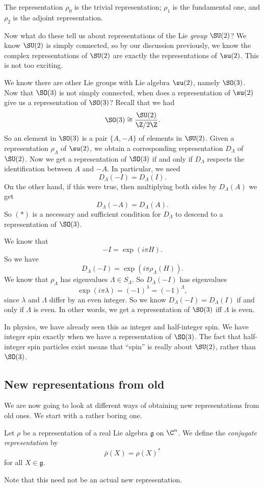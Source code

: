 \documentclass[a4paper]{article}
\begin{document}
The representation $\rho_0$ is the trivial representation; $\rho_1$ is the fundamental one, and $\rho_2$ is the adjoint representation.

Now what do these tell us about representations of the Lie \emph{group} $\SU(2)$? We know $\SU(2)$ is simply connected, so by our discussion previously, we know the complex representations of $\SU(2)$ are exactly the representations of $\su(2)$. This is not too exciting.

We know there are other Lie groups with Lie algebra $\su(2)$, namely $\SO(3)$. Now that $\SO(3)$ is not simply connected, when does a representation of $\su(2)$ give us a representation of $\SO(3)$? Recall that we had
\[
  \SO(3) \cong \frac{\SU(2)}{\Z/2\Z}.
\]
So an element in $\SO(3)$ is a pair $\{A, -A\}$ of elements in $\SU(2)$. Given a representation $\rho_\Lambda$ of $\su(2)$, we obtain a corresponding representation $D_\Lambda$ of $\SU(2)$. Now we get a representation of $\SO(3)$ if and only if $D_\Lambda$ respects the identification between $A$ and $-A$. In particular, we need
\[
  D_\Lambda(-I) = D_\Lambda(I).\tag{$*$}
\]
On the other hand, if this were true, then multiplying both sides by $D_\Lambda(A)$ we get
\[
  D_\Lambda(-A) = D_\Lambda(A).
\]
So $(*)$ is a necessary and sufficient condition for $D_\Lambda$ to descend to a representation of $\SO(3)$.

We know that
\[
  -I = \exp(i\pi H).
\]
So we have
\[
  D_\Lambda(-I) = \exp(i\pi \rho_\Lambda(H)).
\]
We know that $\rho_\Lambda$ has eigenvalues $\Lambda \in S_\Lambda$. So $D_\Lambda(-I)$ has eigenvalues
\[
  \exp(i\pi\lambda) = (-1)^\lambda = (-1)^\Lambda,
\]
since $\lambda$ and $\Lambda$ differ by an even integer. So we know $D_\Lambda(-I) = D_\Lambda (I)$ if and only if $\Lambda$ is even. In other words, we get a representation of $\SO(3)$ iff $\Lambda$ is even.

In physics, we have already seen this as integer and half-integer spin. We have integer spin exactly when we have a representation of $\SO(3)$. The fact that half-integer spin particles exist means that ``spin'' is really about $\SU(2)$, rather than $\SO(3)$.

\subsection{New representations from old}
We are now going to look at different ways of obtaining new representations from old ones. We start with a rather boring one.

\begin{defi}
  Let $\rho$ be a representation of a real Lie algebra $\mathfrak{g}$ on $\C^n$. We define the \emph{conjugate representation} by
  \[
    \bar{\rho}(X) = \rho(X)^*
  \]
  for all $X \in \mathfrak{g}$.
\end{defi}
Note that this need not be an actual new representation.
\end{document}
